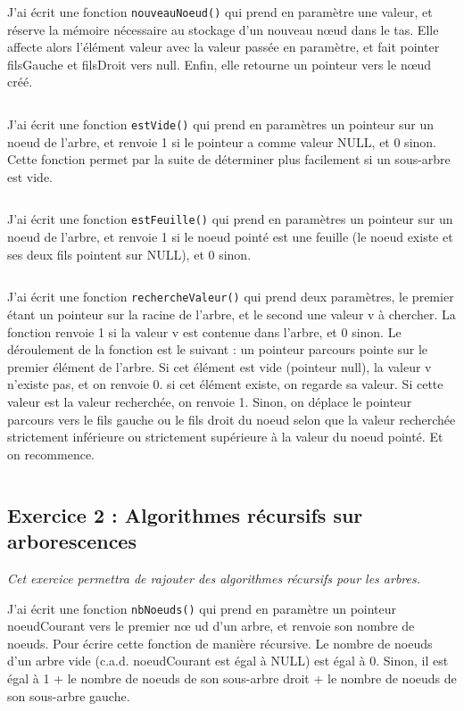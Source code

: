 J'ai écrit une fonction \texttt{nouveauNoeud()} qui prend en paramètre une valeur, et réserve la mémoire nécessaire au stockage d’un nouveau nœud dans le tas. Elle affecte alors l’élément valeur avec la valeur passée en paramètre, et fait pointer filsGauche et filsDroit vers null. Enfin, elle retourne un pointeur vers le nœud créé.
\inputminted[linenos,firstline=9, lastline=24]{cpp}{../sources/cpp/TP3-4/arbresBasiques.c}

J'ai écrit une fonction \texttt{estVide()} qui prend en paramètres un pointeur sur un noeud de l’arbre, et renvoie 1 si le pointeur a comme valeur NULL, et 0 sinon. Cette fonction permet par la suite de déterminer plus facilement si un sous-arbre est vide.
\inputminted[linenos,firstline=76, lastline=78]{cpp}{../sources/cpp/TP3-4/arbresBasiques.c}

J'ai écrit une fonction \texttt{estFeuille()} qui prend en paramètres un pointeur sur un noeud de l’arbre, et renvoie 1 si le noeud pointé est une feuille (le noeud existe et ses deux fils pointent sur NULL), et 0 sinon.
\inputminted[linenos,firstline=80, lastline=84]{cpp}{../sources/cpp/TP3-4/arbresBasiques.c}

J'ai écrit une fonction \texttt{rechercheValeur()} qui prend deux paramètres, le premier étant un pointeur sur la racine de l’arbre, et le second une valeur v à chercher. La fonction renvoie 1 si la valeur v est contenue dans l’arbre, et 0 sinon. Le déroulement de la fonction est le suivant : un pointeur parcours pointe sur le premier élément de l’arbre. Si cet élément est vide (pointeur null), la valeur v n’existe pas, et on renvoie 0. si cet élément existe, on regarde sa valeur. Si cette valeur est la valeur recherchée, on renvoie 1. Sinon, on déplace le pointeur parcours vers le fils gauche ou le fils droit du noeud selon que la valeur recherchée strictement inférieure ou strictement supérieure à la valeur du noeud pointé. Et on recommence.
\inputminted[linenos,firstline=87, lastline=101]{cpp}{../sources/cpp/TP3-4/arbresBasiques.c}

\subsection{Exercice 2 : Algorithmes récursifs sur arborescences}
\textit{Cet exercice permettra de rajouter des algorithmes récursifs pour les arbres.}

J'ai écrit une fonction \texttt{nbNoeuds()} qui prend en paramètre un pointeur noeudCourant vers le premier nœ ud d’un arbre, et renvoie son nombre de noeuds. Pour écrire cette fonction de manière récursive. Le nombre de noeuds d’un arbre vide (c.a.d. noeudCourant est égal à NULL) est égal à 0. Sinon, il est égal à 1 + le nombre de noeuds de son sous-arbre droit + le nombre de noeuds de son sous-arbre gauche.
\inputminted[linenos,firstline=16, lastline=25]{cpp}{../sources/cpp/TP3-4/arbresFctRecursives.c}

